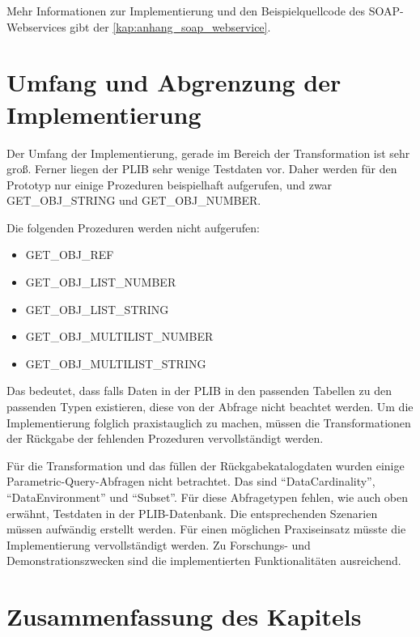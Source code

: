 Mehr Informationen zur Implementierung und den Beispielquellcode des \gls{SOAP}-\glspl{Webservice} gibt der \autoref{kap:anhang_soap_webservice}. 

\section{Umfang und Abgrenzung der Implementierung}

Der Umfang der Implementierung, gerade im Bereich der Transformation ist sehr groß. Ferner liegen der \gls{PLIB} sehr wenige Testdaten vor. Daher werden für den Prototyp nur einige Prozeduren beispielhaft aufgerufen, und zwar GET\_OBJ\_STRING und GET\_OBJ\_NUMBER. 

Die folgenden Prozeduren werden nicht aufgerufen: 
\begin{multicols}{2}
\begin{itemize}
\item GET\_OBJ\_REF
\item GET\_OBJ\_LIST\_NUMBER
\item GET\_OBJ\_LIST\_STRING
\item GET\_OBJ\_MULTILIST\_NUMBER
\item GET\_OBJ\_MULTILIST\_STRING
\end{itemize}
\end{multicols}
Das bedeutet, dass falls Daten in der \gls{PLIB} in den passenden Tabellen zu den passenden Typen existieren, diese von der Abfrage nicht beachtet werden. Um die Implementierung folglich praxistauglich zu machen, müssen die Transformationen der Rückgabe der fehlenden Prozeduren vervollständigt werden. 

Für die Transformation und das füllen der Rückgabekatalogdaten wurden einige Parametric-Query-Abfragen nicht betrachtet. Das sind \enquote{DataCardinality}, \enquote{DataEnvironment} und \enquote{Subset}. Für diese Abfragetypen fehlen, wie auch oben erwähnt, Testdaten in der \gls{PLIB}-Datenbank. Die entsprechenden Szenarien müssen aufwändig erstellt werden. Für einen möglichen Praxiseinsatz müsste die Implementierung vervollständigt werden. Zu Forschungs- und Demonstrationszwecken sind die implementierten Funktionalitäten ausreichend. 
 
\section{Zusammenfassung des Kapitels}


